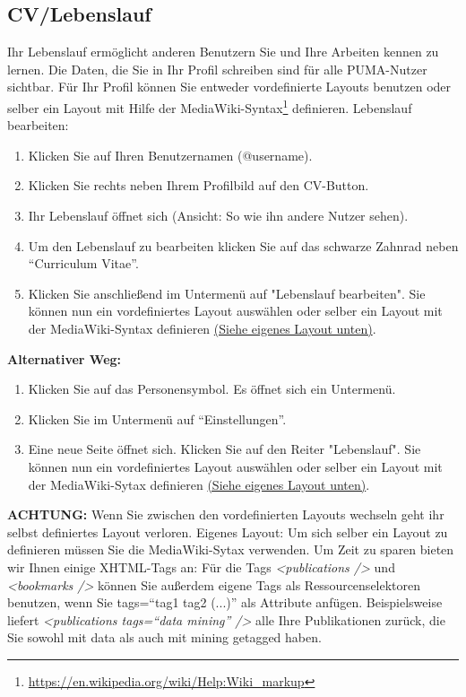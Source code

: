 \documentclass[a4paper,11pt,twoside]{scrbook}
\begin{document}
\subsection{CV/Lebenslauf}
Ihr Lebenslauf ermöglicht anderen Benutzern Sie und Ihre Arbeiten kennen zu lernen. Die Daten, die Sie in Ihr Profil schreiben sind für alle PUMA-Nutzer sichtbar. Für Ihr Profil können Sie entweder vordefinierte Layouts benutzen oder selber ein Layout mit Hilfe der MediaWiki-Syntax\footnote{\url{https://en.wikipedia.org/wiki/Help:Wiki_markup}} definieren. 
\newline
\newline
Lebenslauf bearbeiten:
\begin{enumerate}
    \item Klicken Sie auf Ihren Benutzernamen (@username).
    \item Klicken Sie rechts neben Ihrem Profilbild auf den CV-Button.
    \item Ihr Lebenslauf öffnet sich (Ansicht: So wie ihn andere Nutzer sehen).
    \item Um den Lebenslauf zu bearbeiten klicken Sie auf das schwarze Zahnrad neben \enquote{Curriculum Vitae}.
    \item Klicken Sie anschließend im Untermenü auf "Lebenslauf bearbeiten". Sie können nun ein vordefiniertes Layout auswählen oder selber ein Layout mit der MediaWiki-Syntax definieren \hyperlink{Eigenes Layout}{(Siehe eigenes Layout unten)}.%
\end{enumerate}
\textbf{Alternativer Weg:} 
\begin{enumerate}
    \item Klicken Sie auf das Personensymbol. Es öffnet sich ein Untermenü.
    \item Klicken Sie im Untermenü auf \enquote{Einstellungen}.
    \item Eine neue Seite öffnet sich. Klicken Sie auf den Reiter "Lebenslauf". Sie können nun ein vordefiniertes Layout auswählen oder selber ein Layout mit der MediaWiki-Sytax definieren \hyperlink{Eigenes Layout}{(Siehe eigenes Layout unten)}.%
\end{enumerate}
\textbf{ACHTUNG:} Wenn Sie zwischen den vordefinierten Layouts wechseln geht ihr selbst definiertes Layout verloren. %
\newline
\newline
\hypertarget{Eigenes Layout}{Eigenes Layout:}
\newline
Um sich selber ein Layout zu definieren müssen Sie die MediaWiki-Sytax verwenden. Um Zeit zu sparen bieten wir Ihnen einige XHTML-Tags an: %
\newline
Für die Tags \textit{<publications />} und \textit{<bookmarks />} können Sie außerdem eigene Tags als Ressourcenselektoren benutzen, wenn Sie tags=\enquote{tag1 tag2 (...)} als Attribute anfügen. Beispielsweise liefert \textit{<publications tags=\enquote{data mining} />} alle Ihre Publikationen zurück, die Sie sowohl mit data als auch mit mining getagged haben. 
\end{document}
